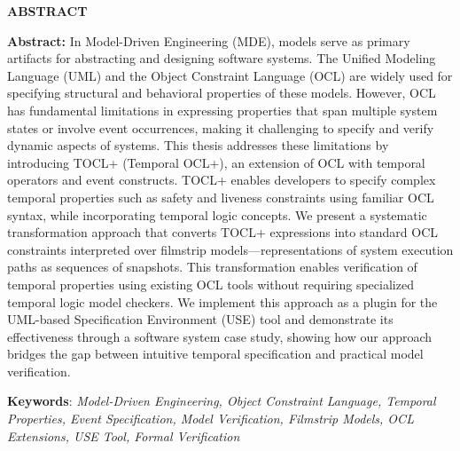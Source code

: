 \begin{center}
  \textbf{\large{ABSTRACT}	}
\end{center}


\begin{small}

\textbf{Abstract:} In Model-Driven Engineering (MDE), models serve as primary artifacts 
for abstracting and designing software systems. The Unified Modeling Language (UML) and 
the Object Constraint Language (OCL) are widely used for specifying structural and 
behavioral properties of these models. However, OCL has fundamental limitations in 
expressing properties that span multiple system states or involve event occurrences, 
making it challenging to specify and verify dynamic aspects of systems. This thesis 
addresses these limitations by introducing TOCL+ (Temporal OCL+), an extension of OCL 
with temporal operators and event constructs. TOCL+ enables developers to specify 
complex temporal properties such as safety and liveness constraints using familiar 
OCL syntax, while incorporating temporal logic concepts. We present a systematic 
transformation approach that converts TOCL+ expressions into standard OCL constraints 
interpreted over filmstrip models—representations of system execution paths as 
sequences of snapshots. This transformation enables verification of temporal 
properties using existing OCL tools without requiring specialized temporal logic
model checkers. We implement this approach as a plugin for the UML-based Specification 
Environment (USE) tool and demonstrate its effectiveness through a software system 
case study, showing how our approach bridges the gap between intuitive temporal 
specification and practical model verification.
  
\textbf{Keywords}: \textit{Model-Driven Engineering, Object Constraint Language, 
Temporal Properties, Event Specification, Model Verification, Filmstrip Models, 
OCL Extensions, USE Tool, Formal Verification}

\end{small}